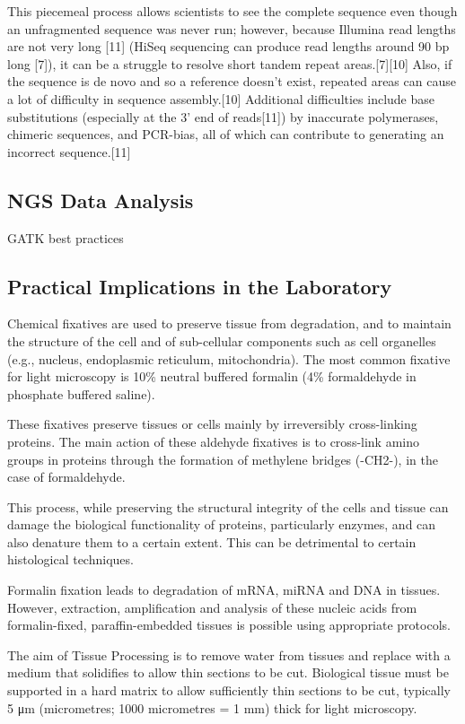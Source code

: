 This piecemeal process allows scientists to see the complete sequence even though an unfragmented sequence was never run; however, because Illumina read lengths are not very long [11] (HiSeq sequencing can produce read lengths around 90 bp long [7]), it can be a struggle to resolve short tandem repeat areas.[7][10] Also, if the sequence is de novo and so a reference doesn’t exist, repeated areas can cause a lot of difficulty in sequence assembly.[10] Additional difficulties include base substitutions (especially at the 3’ end of reads[11]) by inaccurate polymerases, chimeric sequences, and PCR-bias, all of which can contribute to generating an incorrect sequence.[11]



\subsection{NGS Data Analysis}

GATK best practices

\subsection{Practical Implications in the Laboratory}

Chemical fixatives are used to preserve tissue from degradation, and to maintain
the structure of the cell and of sub-cellular components such as cell organelles
(e.g., nucleus, endoplasmic reticulum, mitochondria). The most common fixative
for light microscopy is 10\% neutral buffered formalin (4\% formaldehyde in
phosphate buffered saline).

These fixatives preserve tissues or cells mainly by irreversibly cross-linking
proteins. The main action of these aldehyde fixatives is to cross-link amino
groups in proteins through the formation of methylene bridges (-CH2-), in the
case of formaldehyde.

This process, while preserving the structural integrity of the cells and tissue
can damage the biological functionality of proteins, particularly enzymes, and
can also denature them to a certain extent. This can be detrimental to certain
histological techniques.

Formalin fixation leads to degradation of mRNA, miRNA and DNA in tissues.
However, extraction, amplification and analysis of these nucleic acids from
formalin-fixed, paraffin-embedded tissues is possible using appropriate
protocols.

The aim of Tissue Processing is to remove water from tissues and replace with a
medium that solidifies to allow thin sections to be cut. Biological tissue must
be supported in a hard matrix to allow sufficiently thin sections to be cut,
typically 5 μm (micrometres; 1000 micrometres = 1 mm) thick for light microscopy.

